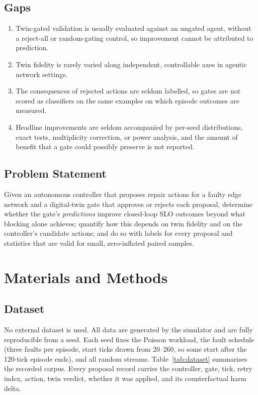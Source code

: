 \documentclass[conference]{IEEEtran}
\begin{document}
\subsection*{Gaps}

\begin{enumerate}
  \renewcommand{\labelenumi}{\textbf{G\arabic{enumi}.}}
  \item Twin-gated validation is usually evaluated against an ungated agent, without a reject-all or random-gating control, so improvement cannot be attributed to prediction.
  \item Twin fidelity is rarely varied along independent, controllable axes in agentic network settings.
  \item The consequences of rejected actions are seldom labelled, so gates are not scored as classifiers on the same examples on which episode outcomes are measured.
  \item Headline improvements are seldom accompanied by per-seed distributions, exact tests, multiplicity correction, or power analysis, and the amount of benefit that a gate could possibly preserve is not reported.
\end{enumerate}

\subsection*{Problem Statement}

Given an autonomous controller that proposes repair actions for a faulty edge network and a digital-twin gate that approves or rejects each proposal, determine whether the gate's \emph{predictions} improve closed-loop SLO outcomes beyond what blocking alone achieves; quantify how this depends on twin fidelity and on the controller's candidate actions; and do so with labels for every proposal and statistics that are valid for small, zero-inflated paired samples.

\section{Materials and Methods}

\subsection{Dataset}

No external dataset is used. All data are generated by the simulator and are fully reproducible from a seed. Each seed fixes the Poisson workload, the fault schedule (three faults per episode, start ticks drawn from 20--260, so some start after the 120-tick episode ends), and all random streams. Table~\ref{tab:dataset} summarises the recorded corpus. Every proposal record carries the controller, gate, tick, retry index, action, twin verdict, whether it was applied, and its counterfactual harm delta.
\end{document}

